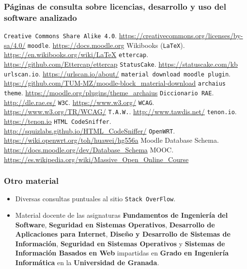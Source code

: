 \subsubsection*{Páginas de consulta sobre licencias, desarrollo y uso del software analizado}
 {\tt Creative Commons Share Alike 4.0}. \url{https://creativecommons.org/licenses/by-sa/4.0/}
 {\tt moodle}. \url{https://docs.moodle.org}
 Wikibooks ({\tt LaTeX}). \url{https://en.wikibooks.org/wiki/LaTeX}
 {\tt ettercap}. \url{https://github.com/Ettercap/ettercap}
 {\tt StatusCake}. \url{https://statuscake.com/kb}
 {\tt urlscan.io}. \url{https://urlscan.io/about/}
 {\tt material download moodle plugin}. \url{https://github.com/TUM-MZ/moodle-block_material-download}
 {\tt archaius theme}. \url{https://moodle.org/plugins/theme_archaius}
 {\tt Diccionario RAE}. \url{http://dle.rae.es/}
 {\tt W3C}. \url{https://www.w3.org/}
 {\tt WCAG}. \url{https://www.w3.org/TR/WCAG/}
 {\tt T.A.W.}. \url{http://www.tawdis.net/}
 {\tt tenon.io}. \url{https://tenon.io}
 {\tt HTML CodeSniffer}. \url{http://squizlabs.github.io/HTML_CodeSniffer/}
 {\tt OpenWRT}. \url{https://wiki.openwrt.org/toh/huawei/hg556a}
 Moodle Database Schema. \url{https://docs.moodle.org/dev/Database_Schema}
 MOOC. \url{https://es.wikipedia.org/wiki/Massive_Open_Online_Course}




\bigskip
\subsubsection*{Otro material}
\begin{itemize}
	\item Diversas consultas puntuales al sitio {\tt Stack OverFlow}.
	\item Material docente de las asignaturas \textbf{Fundamentos de Ingeniería del Software}, \textbf{Seguridad en Sistemas Operativos}, \textbf{Desarrollo de Aplicaciones para Internet}, \textbf{Diseño y Desarrollo de Sistemas de Información}, \textbf{Seguridad en Sistemas Operativos} y \textbf{Sistemas de Información Basados en Web} impartidas en \textbf{Grado en Ingeniería Informática} en la \textbf{Universidad de Granada}.
\end{itemize}